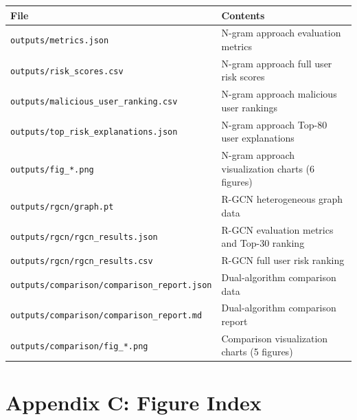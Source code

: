 \documentclass[
  a4paper,
  11pt]{article}
\newcounter{none} %
\begin{document}
{\def\LTcaptype{none} %
\begin{longtable}[]{@{}L{0.28}L{0.66}@{}}
\toprule\noalign{}
File & Contents \\
\midrule\noalign{}
\endhead
\bottomrule\noalign{}
\endlastfoot
\texttt{outputs/metrics.json} & N-gram approach evaluation metrics \\
\texttt{outputs/risk\_scores.csv} & N-gram approach full user risk
scores \\
\texttt{outputs/malicious\_user\_ranking.csv} & N-gram approach
malicious user rankings \\
\texttt{outputs/top\_risk\_explanations.json} & N-gram approach Top-80
user explanations \\
\texttt{outputs/fig\_*.png} & N-gram approach visualization charts (6
figures) \\
\texttt{outputs/rgcn/graph.pt} & R-GCN heterogeneous graph data \\
\texttt{outputs/rgcn/rgcn\_results.json} & R-GCN evaluation metrics and
Top-30 ranking \\
\texttt{outputs/rgcn/rgcn\_results.csv} & R-GCN full user risk
ranking \\
\texttt{outputs/comparison/comparison\_report.json} & Dual-algorithm
comparison data \\
\texttt{outputs/comparison/comparison\_report.md} & Dual-algorithm
comparison report \\
\texttt{outputs/comparison/fig\_*.png} & Comparison visualization charts
(5 figures) \\
\end{longtable}
}

\section{Appendix C: Figure Index}\label{appendix-c-figure-index}
\end{document}
